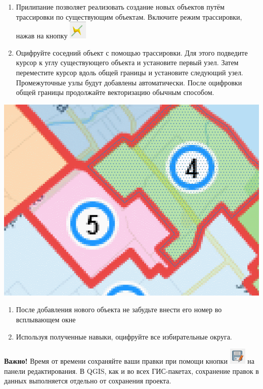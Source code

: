 \documentclass[
  12pt,
]{book}
\begin{document}
\begin{enumerate}
\def\labelenumi{\arabic{enumi}.}
\setcounter{enumi}{10}
\item
  Прилипание позволяет реализовать создание новых объектов путём трассировки по существующим объектам. Включите режим трассировки, нажав на кнопку \includegraphics{images/Ex05_Vectorization/button_tracing.png}
\item
  Оцифруйте соседний объект с помощью трассировки. Для этого подведите курсор к углу существующего объекта и установите первый узел. Затем переместите курсор вдоль общей границы и установите следующий узел. Промежуточные узлы будут добавлены автоматически. После оцифровки общей границы продолжайте векторизацию обычным способом.
\end{enumerate}

\includegraphics{images/Ex05_Vectorization/tracing_vectorization.gif}

\begin{enumerate}
\def\labelenumi{\arabic{enumi}.}
\setcounter{enumi}{12}
\item
  После добавления нового объекта не забудьте внести его номер во всплывающем окне
\item
  Используя полученные навыки, оцифруйте все избирательные округа.
\end{enumerate}

\textbf{Важно!} Время от времени сохраняйте ваши правки при помощи кнопки \includegraphics{images/Ex05_Vectorization/save_edits.png} на панели редактирования. В QGIS, как и во всех ГИС-пакетах, сохранение правок в данных выполняется отдельно от сохранения проекта.
\end{document}

